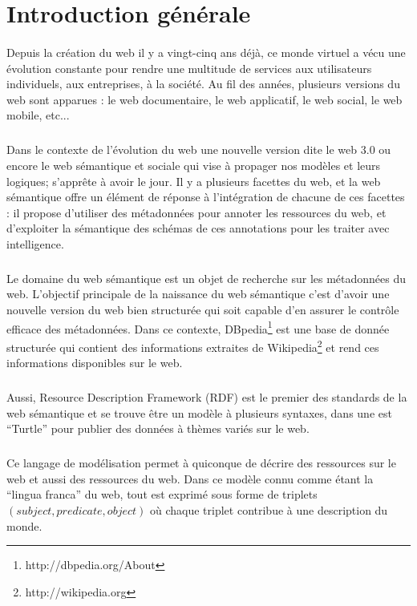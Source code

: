 \section*{Introduction générale}
\paragraph{}
Depuis la création du web il y a vingt-cinq ans déjà, ce monde virtuel a vécu une évolution constante pour rendre une multitude de services aux utilisateurs individuels, aux entreprises, à la société. Au fil des années, plusieurs versions du web sont apparues : le web documentaire, le web applicatif, le web social, le web mobile, etc...
\subparagraph{}
Dans le contexte de l’évolution du web une nouvelle version dite le web 3.0 ou encore le web sémantique et sociale qui vise à propager nos modèles et leurs logiques; s’apprête à avoir le jour. Il y a plusieurs facettes du web, et la web sémantique offre un élément de réponse à l’intégration de chacune de ces facettes : il propose d’utiliser des métadonnées pour annoter les ressources du web, et d’exploiter la sémantique des schémas de ces annotations pour les traiter avec intelligence.
\subparagraph{}
Le domaine du web sémantique est un objet de recherche sur les métadonnées du web. L'objectif principale de la naissance du web sémantique c'est d’avoir une nouvelle version du web bien structurée qui soit capable d’en assurer le contrôle efficace des métadonnées. Dans ce contexte, DBpedia\footnote{http://dbpedia.org/About} est une base de donnée structurée qui contient des informations extraites de Wikipedia\footnote{http://wikipedia.org} et rend ces informations disponibles sur le web.
\subparagraph{}
Aussi, Resource Description Framework (RDF) est le premier des standards de la web sémantique et se trouve être un modèle à plusieurs syntaxes, dans une est  “Turtle” pour publier des données à thèmes variés sur le web.
\subparagraph{}
Ce langage de modélisation permet à quiconque de décrire des ressources sur le web et aussi des ressources du web. Dans ce modèle connu comme étant la “lingua franca” du web, tout est exprimé sous forme de triplets $(subject, predicate, object)$ où chaque triplet contribue à une description du monde.
